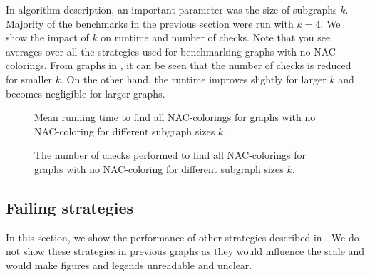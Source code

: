 In \Subgraphs{} algorithm description, an important parameter was the size of subgraphs \( k \).
Majority of the benchmarks in the previous section were run with \( k = 4 \).
%
We show the impact of	\( k \) on runtime and number of checks.
Note that you see averages over all the strategies used for benchmarking
graphs with no NAC-colorings.
%
From graphs in ,
it can be seen that the number of checks is reduced for smaller \( k \).
On the other hand, the runtime improves slightly for larger \( k \)
and becomes negligible for larger graphs.

\begin{figure}[thbp]
	\centering
	\scalebox{\BenchFigureScale}{}
	\caption[Mean runtime for graphs with no NAC-coloring.]{
		Mean running time to find all NAC-colorings for graphs with no NAC-coloring for different subgraph sizes \( k \).}%
	\label{fig:graph_no_nac_coloring_first_runtime_subgraph_size}
\end{figure}%
\begin{figure}[thbp]
	\centering
	\scalebox{\BenchFigureScale}{}
	\caption[Checks performed for graphs with no NAC-coloring.]{
		The number of checks performed to find all NAC-colorings for graphs with no NAC-coloring for different subgraph sizes \( k \).}%
	\label{fig:graph_no_nac_coloring_first_checks_subgraph_size}
\end{figure}%



\subsection{Failing strategies}%
\label{sec:failing_strategies}

In this section, we show the performance of other strategies described in .
We do not show these strategies in previous graphs as they would influence
the scale and would make figures and legends unreadable and unclear.

